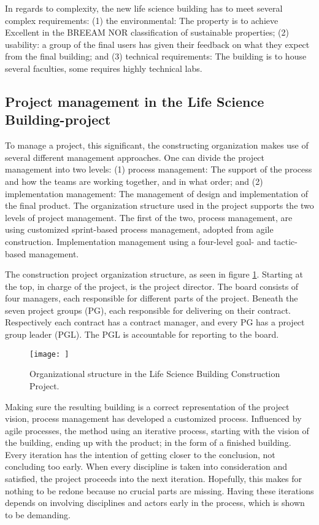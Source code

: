 In regards to complexity, the new life science building has to meet several complex requirements: (1) the environmental: The property is to achieve Excellent in the BREEAM NOR classification of sustainable properties; (2) usability: a group of the final users has given their feedback on what they expect from the final building; and (3) technical requirements: The building is to house several faculties, some requires highly technical labs.


\subsection{Project management in the Life Science Building-project}
To manage a project, this significant, the constructing organization makes use of several different management approaches. One can divide the project management into two levels: (1) process management: The support of the process and how the teams are working together, and in what order; and (2) implementation management: The management of design and implementation of the final product. The organization structure used in the project supports the two levels of project management. The first of the two, process management, are using customized sprint-based process management, adopted from agile construction. Implementation management using a four-level goal- and tactic-based management.  

The construction project organization structure, as seen in figure \ref{fig:project_structure}. Starting at the top, in charge of the project, is the project director. The board consists of four managers, each responsible for different parts of the project. Beneath the seven project groups (PG), each responsible for delivering on their contract. Respectively each contract has a contract manager, and every PG has a project group leader (PGL). The PGL is accountable for reporting to the board.

\begin{figure}
    \centering
    \texttt{[image: ]}
    \caption{Organizational structure in the Life Science Building Construction Project.}
    \label{fig:project_structure}
\end{figure}

Making sure the resulting building is a correct representation of the project vision, process management has developed a customized process. Influenced by agile processes, the method using an iterative process, starting with the vision of the building, ending up with the product; in the form of a finished building. Every iteration has the intention of getting closer to the conclusion, not concluding too early. When every discipline is taken into consideration and satisfied, the project proceeds into the next iteration. Hopefully, this makes for nothing to be redone because no crucial parts are missing. Having these iterations depends on involving disciplines and actors early in the process, which is shown to be demanding.

